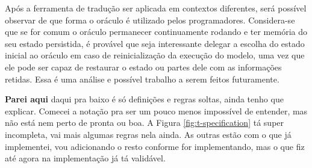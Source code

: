 Após a ferramenta de tradução ser aplicada em contextos diferentes, será
possível observar de que forma o oráculo é utilizado pelos programadores.
Considera-se que se for comum o oráculo permanecer continuamente rodando e ter
memória do seu estado persistida, é provável que seja interessante delegar a
escolha do estado inicial ao oráculo em caso de reinicialização da execução do
modelo, uma vez que ele pode ser capaz de restaurar o estado ou partes dele com
as informações retidas. Essa é uma análise e possível trabalho a serem feitos
futuramente.

\textbf{Parei aqui} daqui pra baixo é só definições e regras soltas, ainda tenho
que explicar. Comecei a notação pra ser um pouco menos impossível de entender,
mas não está nem perto de pronta ou boa. A Figura \ref{fig:t-specification} tá super
incompleta, vai mais algumas regras nela ainda. As outras estão com o que já
implementei, vou adicionando o resto conforme for implementando, mas o que fiz
até agora na implementação já tá validável.

